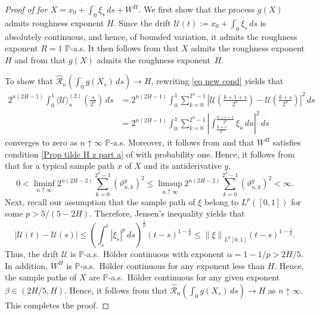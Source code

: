 \documentclass[12pt,reqno]{article}
\newcommand{\norm}[1]{\left\lVert {#1}\right\rVert}
\def\ua{\uparrow}
\def\wh{\widehat}
\numberwithin{equation}{section}
\def\cR{{\mathscr R}}
\theoremstyle{definition}
\def\<{\langle}
\def\>{\rangle}
\def\ua{\uparrow}
\def\wh{\widehat}
\newcommand{\calU}{\mathcal{U}}
\newcommand{\bP}{\mathbb{P}}
\begin{document}
\begin{proof}[ Proof of  for $X = x_0 + \int_0^\cdot \xi_s \, ds + W^H$]
	 We first show that the process $g(X)$ admits roughness exponent $H$. Since the drift $\calU(t) := x_0 + \int_{0}^{\cdot} \xi_s \, ds$ is absolutely continuous, and hence, of bounded variation, it admits the roughness exponent $R = 1$ $\bP$-a.s.  It then follows from  that $X$ admits the roughness exponent $H$ and from  that $g(X)$ admits the roughness exponent~$H$. 
	
	To show that $\wh \cR_n(\int_0^\cdot g(X_s) \,ds) \rightarrow H$, rewriting \eqref{eq new cond} yields that 
	\begin{equation*}
		\begin{split}
			2^{n(2H-1)}\int_0^1 \<\calU\>^{(2)}_n\left(\frac{s}{2^n}\right)\,ds &= 2^{n(2H-1)}\int_0^1 \sum_{k = 0}^{2^n-1} \left|\calU\left(\frac{k+1 +s }{2^n}\right) - \calU\left(\frac{k+s}{2^n}\right) \right|^2 \,ds \\&= 2^{n(2H-1)}\int_0^1 \sum_{k = 0}^{2^n-1}\left|\int_{\frac{k+s}{2^n}}^{\frac{k+s+1}{2^n}} \xi_u \, du\right|^2 \, ds
		\end{split}
	\end{equation*}
	converges to zero as $n \ua \infty$ $\bP$-a.s. Moreover, it follows from  and  that  $W^H$ satisfies condition \ref{Prop tilde H z part a} of  with probability one. Hence, it follows from  that for a typical sample path $x$ of $X$ and its antiderivative $y$, 
	\begin{equation*}
		0 < \liminf_{n \ua \infty} 2^{n(2H-2)} \sum_{k = 0}^{2^n-1} \left(\vartheta^y_{n,k}\right)^2 \le \limsup_{n \ua \infty} 2^{n(2H-2)} \sum_{k = 0}^{2^n-1} \left(\vartheta^y_{n,k}\right)^2 < \infty.
	\end{equation*}
Next, recall our assumption that the sample path of $\xi$ belong to  $ L^p([0,1])$ for some $p>5/(5-2H)$. Therefore,  Jensen's inequality yields that 
$$	\left|\calU(t) - \calU(s)\right| \le \left(\int_s^t |\xi_s|^p\, ds \right)^{\frac{1}{p}} (t - s)^{1 - \frac{1}{p}} \le \norm{\xi}_{L^p[0,1]}(t - s)^{1 - \frac{1}{p}}. 
$$
Thus, the drift $\calU$ is $\bP$-a.s.~H\"{o}lder continuous with exponent $\alpha = 1- 1/p > 2H/5$. In addition, $W^H$ is $\bP$-a.s.~H\"{o}lder continuous for any exponent less than $H$. Hence, the sample paths of $X$ are $\bP$-a.s.~H\"{o}lder continuous for any given exponent $\beta \in( 2H/5,H)$. Hence, it follows from  that $\wh \cR_n(\int_0^\cdot g(X_s) \,ds) \rightarrow H$ as $n \ua \infty$. This completes the proof.
\end{proof}
\end{document}
